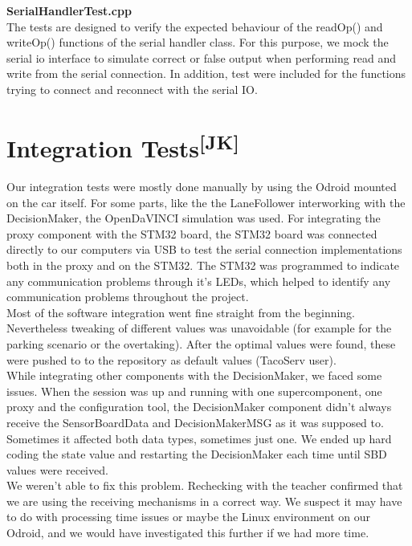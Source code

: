 \noindent
\textbf{SerialHandlerTest.cpp}\\
The tests are designed to verify the expected behaviour of the readOp() and
writeOp() functions of the serial handler class. For this purpose, we mock the
serial io interface to simulate correct or false output when performing read and
write from the serial connection. In addition, test were included for the
functions trying to connect and reconnect with the serial IO.

\newpage
\section[Integration Tests]{Integration Tests\textsuperscript{[JK]}}
Our integration tests were mostly done manually by using the Odroid mounted on
the car itself. For some parts, like the the LaneFollower interworking with the
DecisionMaker, the OpenDaVINCI simulation was used. For integrating the proxy
component with the STM32 board, the STM32 board was connected directly to our
computers via USB to test the serial connection implementations both in the
proxy and on the STM32. The STM32 was programmed to indicate any communication
problems through it's LEDs, which helped to identify any communication problems
throughout the project.\\

\noindent
Most of the software integration went fine straight from the beginning.
Nevertheless tweaking of different values was unavoidable (for example for the
parking scenario or the overtaking). After the optimal values were found, these
were pushed to to the repository as default values (TacoServ user).\\

\noindent
While integrating other components with the DecisionMaker, we faced some issues.
When the session was up and running with one supercomponent, one proxy and the
configuration tool, the DecisionMaker component didn't always receive the
SensorBoardData and DecisionMakerMSG as it was supposed to. Sometimes it
affected both data types, sometimes just one. We ended up hard coding the state
value and restarting the DecisionMaker each time until SBD values were received.
\\
We weren't able to fix this problem. Rechecking with the teacher confirmed that
we are using the receiving mechanisms in a correct way. We suspect it may have
to do with processing time issues or maybe the Linux environment on our Odroid,
and we would have investigated this further if we had more time.
